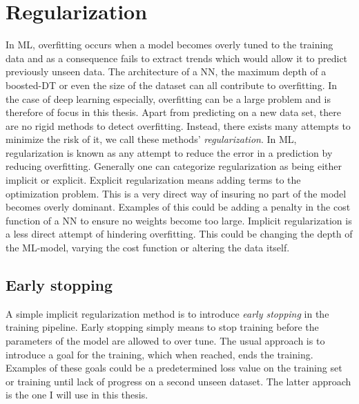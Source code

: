 \section{Regularization}
In \ac{ML}, overfitting occurs when a model becomes overly tuned to the training data and as a consequence 
fails to extract trends which would allow it to predict previously unseen data. The architecture of a \ac{NN}, 
the maximum depth of a boosted-\ac{DT} or even the size of the dataset can all contribute to overfitting. In the 
case of deep learning especially, overfitting can be a large problem and is therefore of focus in this thesis. Apart 
from predicting on a new data set, there are no rigid methods to detect overfitting. Instead, there exists many 
attempts to minimize the risk of it, we call these methods' \emph{regularization}. In \ac{ML}, regularization 
is known as any attempt to reduce the error in a prediction by reducing overfitting. Generally one can categorize
regularization as being either implicit or explicit. Explicit regularization means adding terms to the optimization 
problem. This is a very direct way of insuring no part of the model becomes overly dominant. Examples of this 
could be adding a penalty in the cost function of a \ac{NN} to ensure no weights become too large. Implicit
regularization is a less direct attempt of hindering overfitting. This could be changing the depth of the \ac{ML}-model,
varying the cost function or altering the data itself.
\subsection{Early stopping}\label{subsec:EarlyStopping}
A simple implicit regularization method is to introduce \emph{early stopping} in the training pipeline. Early stopping 
simply means to stop training before the parameters of the model are allowed to over tune. The usual approach 
is to introduce a goal for the training, which when reached, ends the training. Examples of these goals could be a 
predetermined loss value on the training set or training until lack of progress on a second unseen dataset. The latter
approach is the one I will use in this thesis. 
